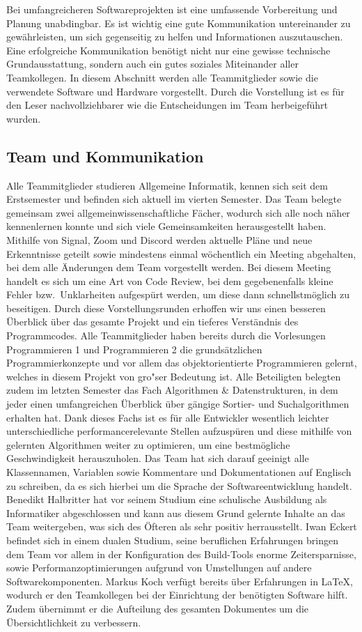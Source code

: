 Bei umfangreicheren Softwareprojekten ist eine umfassende Vorbereitung und Planung unabdingbar.
Es ist wichtig eine gute Kommunikation untereinander zu gew\"ahrleisten, um sich gegenseitig zu helfen und Informationen auszutauschen.
Eine erfolgreiche Kommunikation ben\"otigt nicht nur eine gewisse technische Grundausstattung, sondern auch ein gutes soziales Miteinander aller Teamkollegen.
In diesem Abschnitt werden alle Teammitglieder sowie die verwendete Software und Hardware vorgestellt.
Durch die Vorstellung ist es f\"ur den Leser nachvollziehbarer wie die Entscheidungen im Team herbeigef\"uhrt wurden.

\subsection{Team und Kommunikation}\label{subsec:team-und-kommunikation}
Alle Teammitglieder studieren Allgemeine Informatik, kennen sich seit dem Erstsemester und befinden sich aktuell im vierten Semester.
Das Team belegte gemeinsam zwei allgemeinwissenschaftliche F\"acher, wodurch sich alle noch n\"aher kennenlernen konnte und sich viele Gemeinsamkeiten herausgestellt haben.
Mithilfe von Signal, Zoom und Discord werden aktuelle Pl\"ane und neue Erkenntnisse geteilt sowie mindestens einmal w\"ochentlich ein Meeting abgehalten, bei dem alle \"Anderungen dem Team vorgestellt werden.
Bei diesem Meeting handelt es sich um eine Art von Code Review, bei dem gegebenenfalls kleine Fehler bzw.\ Unklarheiten aufgesp\"urt werden, um diese dann schnellstm\"oglich zu beseitigen.
Durch diese Vorstellungsrunden erhoffen wir uns einen besseren \"Uberblick \"uber das gesamte Projekt und ein tieferes Verst\"andnis des Programmcodes.
Alle Teammitglieder haben bereits durch die Vorlesungen Programmieren 1 und Programmieren 2 die grunds\"atzlichen Programmierkonzepte und vor allem das objektorientierte Programmieren gelernt, welches in diesem Projekt von gro"ser Bedeutung ist.
Alle Beteiligten belegten zudem im letzten Semester das Fach Algorithmen \& Datenstrukturen, in dem jeder einen umfangreichen \"Uberblick \"uber g\"angige Sortier- und Suchalgorithmen erhalten hat.
Dank dieses Fachs ist es f\"ur alle Entwickler wesentlich leichter unterschiedliche performancerelevante Stellen aufzusp\"uren und diese mithilfe von gelernten Algorithmen weiter zu optimieren, um eine bestm\"ogliche Geschwindigkeit herauszuholen.
Das Team hat sich darauf geeinigt alle Klassennamen, Variablen sowie Kommentare und Dokumentationen auf Englisch zu schreiben, da es sich hierbei um die Sprache der Softwareentwicklung handelt.
Benedikt Halbritter hat vor seinem Studium eine schulische Ausbildung als Informatiker abgeschlossen und kann aus diesem Grund gelernte Inhalte an das Team weitergeben, was sich des \"Ofteren als sehr positiv herrausstellt.
Iwan Eckert befindet sich in einem dualen Studium, seine beruflichen Erfahrungen bringen dem Team vor allem in der Konfiguration des Build-Tools enorme Zeitersparnisse, sowie Performanzoptimierungen aufgrund von Umstellungen auf andere Softwarekomponenten.
Markus Koch verf\"ugt bereits \"uber Erfahrungen in LaTeX, wodurch er den Teamkollegen bei der Einrichtung der ben\"otigten Software hilft.
Zudem \"ubernimmt er die Aufteilung des gesamten Dokumentes um die \"Ubersichtlichkeit zu verbessern.

